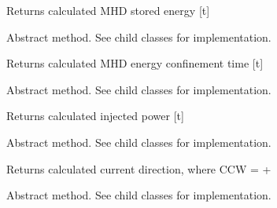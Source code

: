\documentclass[letterpaper,10pt,english]{sphinxmanual}
\begin{document}
\begin{fulllineitems}
\begin{fulllineitems}
Returns calculated MHD stored energy {[}t{]}

\end{fulllineitems}


\begin{fulllineitems}
\label{\detokenize{eqtools:eqtools.core.Equilibrium.getTauMHD}}
Abstract method.  See child classes for implementation.

Returns calculated MHD energy confinement time {[}t{]}

\end{fulllineitems}


\begin{fulllineitems}
\label{\detokenize{eqtools:eqtools.core.Equilibrium.getPinj}}
Abstract method.  See child classes for implementation.

Returns calculated injected power {[}t{]}

\end{fulllineitems}


\begin{fulllineitems}
\label{\detokenize{eqtools:eqtools.core.Equilibrium.getCurrentSign}}
Abstract method.  See child classes for implementation.

Returns calculated current direction, where CCW = +

\end{fulllineitems}


\begin{fulllineitems}
\label{\detokenize{eqtools:eqtools.core.Equilibrium.getWbdot}}
Abstract method.  See child classes for implementation.


\end{fulllineitems}
\end{fulllineitems}
\end{document}

